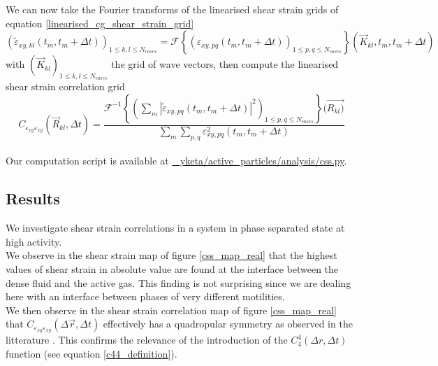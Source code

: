 \documentclass[class=report, float=false, crop=false]{standalone}
\begin{document}
We can now take the Fourier transforms of the linearised shear strain grids of equation \ref{linearised_cg_shear_strain_grid}
\begin{equation}
(\tilde{\varepsilon}_{xy,kl}(t_m, t_m + \Delta t))_{1 \leq k, l \leq N_{cases}} = \mathcal{F}\left\{(\varepsilon_{xy,pq}(t_m, t_m + \Delta t))_{1 \leq p, q \leq N_{cases}}\right\}(\vec{K}_{kl}, t_m, t_m + \Delta t)
\end{equation}
with $(\vec{K}_{kl})_{1 \leq k, l \leq N_{cases}}$ the grid of wave vectors, then compute the linearised shear strain correlation grid
\begin{equation}
C_{\varepsilon_{xy}\varepsilon_{xy}}(\vec{R}_{kl}, \Delta t) = \frac{\mathcal{F}^{-1}\left\{\left(\sum_m |\tilde{\varepsilon}_{xy,pq}(t_m, t_m + \Delta t)|^2\right)_{1 \leq p, q \leq N_{cases}}\right\}(\vec{R_{kl})}}{\sum_m\sum_{p, q} \varepsilon_{xy, pq}^2(t_m, t_m + \Delta t)}
\end{equation}
\mbox{}\\

Our computation script is available at \href{https://github.com/yketa/active_particles/blob/master/analysis/css.py}{{\faGithub~ yketa/active\_particles/analysis/css.py}}.

\subsection{Results}


We investigate shear strain correlations in a system in phase separated state at high activity.\\

We observe in the shear strain map of figure \ref{css_map_real} that the highest values of shear strain in absolute value are found at the interface between the dense fluid and the active gas. This finding is not surprising since we are dealing here with an interface between phases of very different motilities.\\

We then observe in the shear strain correlation map of figure \ref{css_map_real} that $C_{\varepsilon_{xy}\varepsilon_{xy}}(\Delta \vec{r}, \Delta t)$ effectively has a quadropular symmetry as observed in the litterature \cite{illing2016strain, hassani2018long}. This confirms the relevance of the introduction of the $C_4^4(\Delta r, \Delta t)$ function (see equation \ref{c44_definition}).\\
\end{document}

